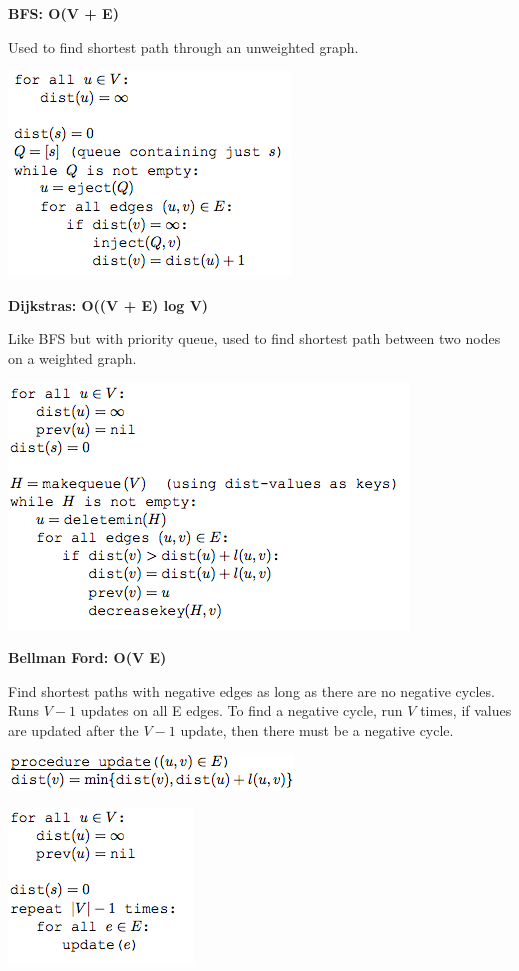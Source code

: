 \documentclass[landscape]{article}
\begin{document}
\begin{multicols}{3}
\textbf{BFS: O(V + E)}

Used to find shortest path through an unweighted graph.

\includegraphics[scale=0.5]{BFS}

\textbf{Dijkstras: O((V + E) log V)}

Like BFS but with priority queue, used to find shortest path between two nodes on a weighted graph.

\includegraphics[scale=0.5]{dijkstra}

\textbf{Bellman Ford: O(V  E)}

Find shortest paths with negative edges as long as there are no negative cycles. Runs $V -1$ updates on all E edges. To find a negative cycle, run $V$ times, if values are updated after the $V -1$ update, then there must be a negative cycle.

\includegraphics[scale=0.5]{BF1}

\includegraphics[scale=0.5]{BF2}


\end{multicols}
\end{document}
